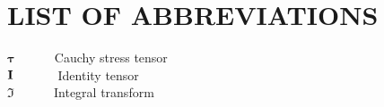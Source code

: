 \chapter*{LIST OF ABBREVIATIONS}
\def\ds{\displaystyle\mathstrut}
\def\baselinestretch{1.65}


$\boldsymbol \tau \,\,\,\,\,\,\,\,\,\,\,\,\,\,\,\,\,\,\,$Cauchy stress tensor\\
${\bf{I}}\,\,\,\,\,\,\,\,\,\,\,\,\,\,\,\,\,\,\,\,\,$Identity tensor\\
${\mathfrak{I}}\,\,\,\,\,\,\,\,\,\,\,\,\,\,\,\,\,\,\,$Integral transform\\
